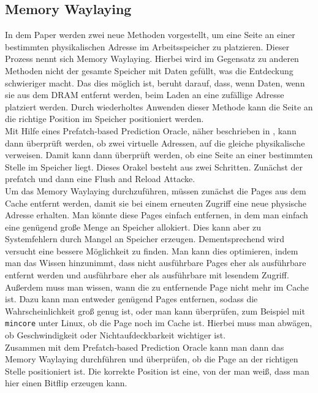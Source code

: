 \documentclass[conference]{IEEEtran}
\begin{document}
\subsection{Memory Waylaying}
In dem Paper werden zwei neue Methoden vorgestellt, um eine Seite an einer bestimmten physikalischen Adresse im Arbeitsspeicher zu platzieren. Dieser Prozess nennt sich Memory Waylaying. Hierbei wird im Gegensatz zu anderen Methoden nicht der gesamte Speicher mit Daten gefüllt, was die Entdeckung schwieriger macht. Das dies möglich ist, beruht darauf, dass, wenn Daten, wenn sie aus dem DRAM entfernt werden, beim Laden an eine zufällige Adresse platziert werden. Durch wiederholtes Anwenden dieser Methode kann die Seite an die richtige Position im Speicher positioniert werden.\\
 Mit Hilfe eines Prefatch-based Prediction Oracle, näher beschrieben in \cite{DBLP:conf/ccs/2016}, kann dann überprüft werden, ob zwei virtuelle Adressen, auf die gleiche physikalische verweisen. Damit kann dann überprüft werden, ob eine Seite an einer bestimmten Stelle im Speicher liegt. Dieses Orakel besteht aus zwei Schritten. Zunächst der prefatch und dann eine Flush and Reload Attacke. \\
Um das Memory Waylaying durchzuführen, müssen zunächst die Pages aus dem Cache entfernt werden, damit sie bei einem erneuten Zugriff eine neue physische Adresse erhalten. Man könnte diese Pages einfach entfernen, in dem man einfach eine genügend große Menge an Speicher allokiert. Dies kann aber zu Systemfehlern durch Mangel an Speicher erzeugen. Dementsprechend wird versucht eine bessere Möglichkeit zu finden. Man kann dies optimieren, indem man das Wissen hinzunimmt, dass nicht ausführbare Pages eher als ausführbare entfernt werden und ausführbare eher als ausführbare mit lesendem Zugriff. Außerdem muss man wissen, wann die zu entfernende Page nicht mehr im Cache ist. Dazu kann man entweder genügend Pages entfernen, sodass die Wahrscheinlichkeit groß genug ist, oder man kann überprüfen, zum Beispiel mit \texttt{mincore} unter Linux, ob die Page noch im Cache ist. Hierbei muss man abwägen, ob Geschwindigkeit oder Nichtaufdeckbarkeit wichtiger ist.\\
Zusammen mit dem Prefatch-based Prediction Oracle kann man dann das Memory Waylaying durchführen und überprüfen, ob die Page an der richtigen Stelle positioniert ist. Die korrekte Position ist eine, von der man weiß, dass man hier einen Bitflip erzeugen kann.\\
\end{document}
